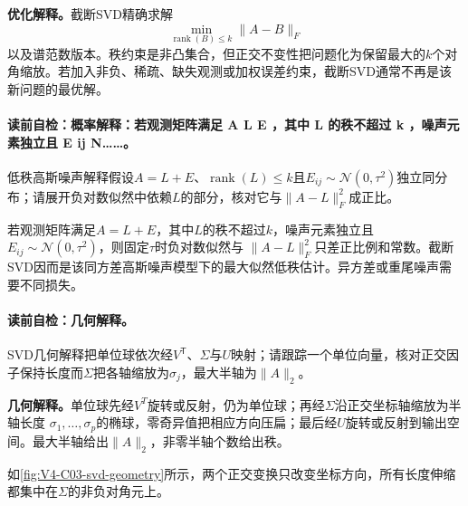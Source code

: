 \label{struct:V4-C03-CH16}
\begin{optimizationbox}
\textbf{优化解释。}截断SVD精确求解
\[
\min_{\operatorname{rank}(B)\leq k}\|A-B\|_F
\]
以及谱范数版本。秩约束是非凸集合，但正交不变性把问题化为保留最大的$k$个对角缩放。若加入非负、稀疏、缺失观测或加权误差约束，截断SVD通常不再是该新问题的最优解。
\end{optimizationbox}

\label{struct:V4-C03-CH15}
\paragraph{读前自检：概率解释：若观测矩阵满足 A L E ，其中 L 的秩不超过 k ，噪声元素独立且 E ij N……。}低秩高斯噪声解释假设$A=L+E$、$\operatorname{rank}(L)\le k$且$E_{ij}\sim\mathcal N(0,\tau^2)$独立同分布；请展开负对数似然中依赖$L$的部分，核对它与$\lVert A-L\rVert_F^2$成正比。\par

\begin{probabilitybox}
若观测矩阵满足$A=L+E$，其中$L$的秩不超过$k$，噪声元素独立且
$E_{ij}\sim\mathcal N(0,\tau^2)$，则固定$\tau$时负对数似然与
$\|A-L\|_F^2$只差正比例和常数。截断SVD因而是该同方差高斯噪声模型下的最大似然低秩估计。异方差或重尾噪声需要不同损失。
\end{probabilitybox}

\paragraph{读前自检：几何解释。}SVD几何解释把单位球依次经$V^{\mathsf T}$、$\Sigma$与$U$映射；请跟踪一个单位向量，核对正交因子保持长度而$\Sigma$把各轴缩放为$\sigma_j$，最大半轴为$\lVert A\rVert_2$。\par

\label{struct:V4-C03-CH14}
\begin{geometrybox}
\textbf{几何解释。}单位球先经$V^T$旋转或反射，仍为单位球；再经$\Sigma$沿正交坐标轴缩放为半轴长度
$\sigma_1,\ldots,\sigma_p$的椭球，零奇异值把相应方向压扁；最后经$U$旋转或反射到输出空间。最大半轴给出$\|A\|_2$，非零半轴个数给出秩。
\end{geometrybox}

\label{struct:V4-C03-CH17}
如\cref{fig:V4-C03-svd-geometry}所示，两个正交变换只改变坐标方向，所有长度伸缩都集中在$\Sigma$的非负对角元上。


